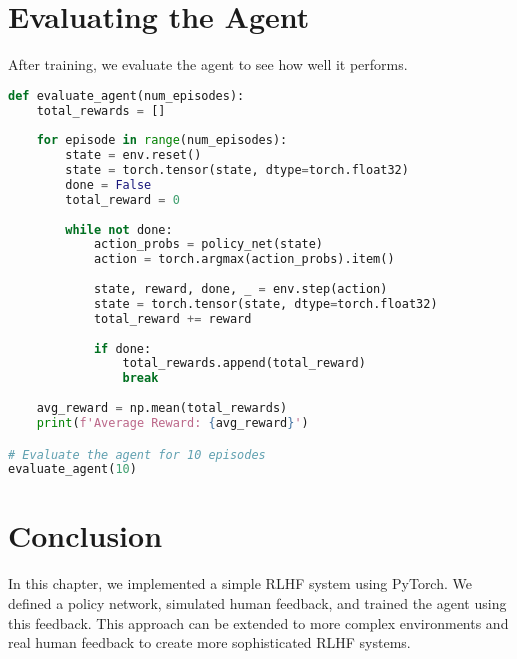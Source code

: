 \section{Evaluating the Agent}
After training, we evaluate the agent to see how well it performs.

\begin{lstlisting}[language=python]
def evaluate_agent(num_episodes):
    total_rewards = []
    
    for episode in range(num_episodes):
        state = env.reset()
        state = torch.tensor(state, dtype=torch.float32)
        done = False
        total_reward = 0
        
        while not done:
            action_probs = policy_net(state)
            action = torch.argmax(action_probs).item()
            
            state, reward, done, _ = env.step(action)
            state = torch.tensor(state, dtype=torch.float32)
            total_reward += reward
            
            if done:
                total_rewards.append(total_reward)
                break
    
    avg_reward = np.mean(total_rewards)
    print(f'Average Reward: {avg_reward}')

# Evaluate the agent for 10 episodes
evaluate_agent(10)
\end{lstlisting}

\section{Conclusion}
In this chapter, we implemented a simple RLHF system using PyTorch. We defined a policy network, simulated human feedback, and trained the agent using this feedback. This approach can be extended to more complex environments and real human feedback to create more sophisticated RLHF systems.


